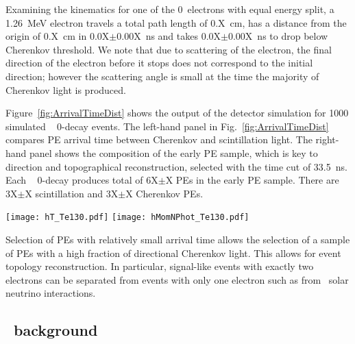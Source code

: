 Examining the kinematics for one of the 0\nbb~electrons with equal energy split, a 1.26~MeV electron travels a total path length of 0.X~cm, 
has a distance from the origin of 0.X~cm in 0.0X$\pm$0.00X~ns  and takes 0.0X$\pm$0.00X~ns to drop below Cherenkov threshold. 
We note that due to scattering of the electron, the final direction of the electron before it stops does not correspond to the initial 
direction; however the scattering angle is small at the time the majority of Cherenkov light is produced.

Figure~\ref{fig:ArrivalTimeDist} shows the output of the detector simulation for 1000 simulated \Te~ 0\nbb-decay 
events. The left-hand panel in Fig.~\ref{fig:ArrivalTimeDist} compares PE arrival time between Cherenkov and scintillation light.
The right-hand panel shows the composition of the early PE sample, which is key to direction and topographical reconstruction, 
selected with the time cut of 33.5~ns. Each \Te~ 0\nbb-decay produces total of 6X$\pm$X PEs in the early PE sample. 
There are 3X$\pm$X scintillation and 3X$\pm$X Cherenkov PEs.


\begin{figure*}[ht]
  \centering
  \texttt{[image: hT\_Te130.pdf]}
  \texttt{[image: hMomNPhot\_Te130.pdf]}
  \caption{\emph{Left:} Photo-electron (PE) arrival times after
    application of the photo-detector transit time spread (TTS) of 100~ps for the default simulation 
    of \Te~0\nbb-decay produced at the center of the detector. 
    Scintillation PEs (blue solid line) are compared to Cherenkov PEs (red dotted line)
    The vertical line at 33.5~ns indicates the time cut for the selection of the early PE sample.
    \emph{Right:} Composition of the early PE sample: 
    number of Cherenkov (\emph{dashed red line}), scintillation (\emph{dotted blue line}), 
    and total (\emph{solid black line}) PEs per event.} 
\label{fig:ArrivalTimeDist}
\end{figure*}


Selection of PEs with relatively small arrival time allows the selection of a sample of PEs with a high fraction of directional Cherenkov light.
This allows for event topology reconstruction. In particular, signal-like events with exactly two electrons can be separated from events 
with only one electron such as from \B~solar neutrino interactions.


\subsection{\B~background}

